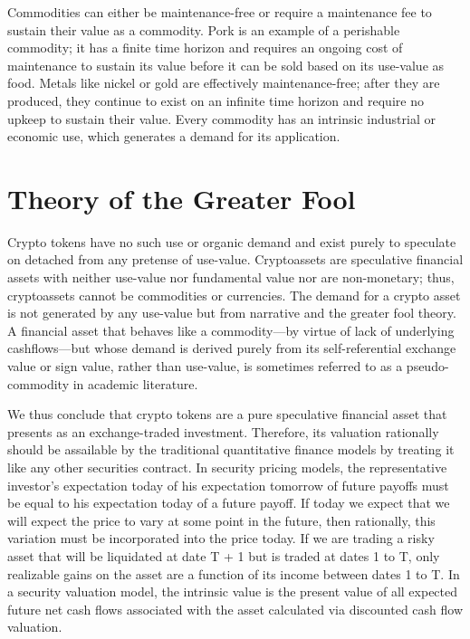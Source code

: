Commodities can either be maintenance-free or require a maintenance fee to
sustain their value as a commodity. Pork is an example of a perishable
commodity; it has a finite time horizon and requires an ongoing cost of
maintenance to sustain its value before it can be sold based on its use-value as
food. Metals like nickel or gold are effectively maintenance-free; after they
are produced, they continue to exist on an infinite time horizon and require no
upkeep to sustain their value. Every commodity has an intrinsic industrial or
economic use, which generates a demand for its application.

\section{Theory of the Greater Fool}

Crypto tokens have no such use or organic demand and exist purely to speculate
on detached from any pretense of use-value. Cryptoassets are speculative
financial assets with neither use-value nor fundamental value nor are
non-monetary; thus, cryptoassets cannot be commodities or currencies. The demand
for a crypto asset is not generated by any use-value but from narrative and the
greater fool theory. A financial asset that behaves like a commodity—by virtue
of lack of underlying cashflows—but whose demand is derived purely from its
self-referential exchange value or sign value, rather than use-value, is
sometimes referred to as a pseudo-commodity in academic literature.

We thus conclude that crypto tokens are a pure speculative financial asset that
presents as an exchange-traded investment. Therefore, its valuation rationally
should be assailable by the traditional quantitative finance models by treating
it like any other securities contract. In security pricing models, the
representative investor's expectation today of his expectation tomorrow of
future payoffs must be equal to his expectation today of a future payoff. If
today we expect that we will expect the price to vary at some point in the
future, then rationally, this variation must be incorporated into the price
today. If we are trading a risky asset that will be liquidated at date T + 1 but
is traded at dates 1 to T, only realizable gains on the asset are a function of
its income between dates 1 to T. In a security valuation model, the intrinsic
value is the present value of all expected future net cash flows associated with
the asset calculated via discounted cash flow valuation.

